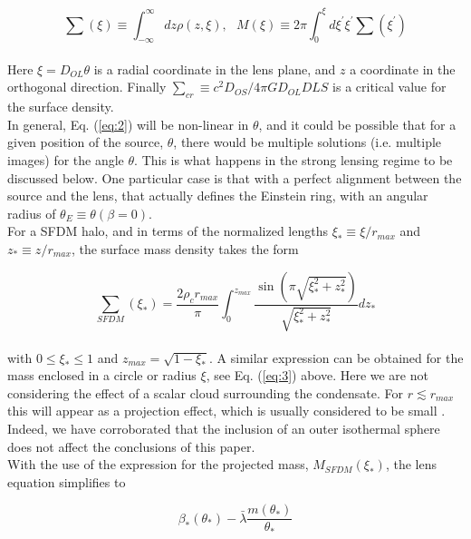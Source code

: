 \documentclass[8pt,letterpaper,twocolumn]{article}
\begin{document}
\begin{equation} \label{eq:3}
{\textstyle \sum}(\xi) \equiv \int_{-\infty}^{\infty} dz \rho(z,\xi),\ \ \ M(\xi) \equiv 2 \pi \int_{0}^{\xi}d\xi^\prime \xi^\prime  {\textstyle \sum}(\xi^\prime )
\end{equation}
\\
Here $\xi = D_{OL}\theta$ is a radial coordinate in the lens plane, and $z$ a coordinate in the orthogonal direction. Finally $\sum_{cr} \equiv c^2 D_{OS}/4\pi GD_{OL}D{LS}$ is a critical value for the surface density.\\

In general, Eq. (\ref{eq:2}) will be non-linear in $\theta$, and it could be possible that for a given position of the source, $\theta$, there would be multiple solutions (i.e. multiple images) for the angle $\theta$. This is what happens in the strong lensing regime to be discussed below. One particular case is that with a perfect alignment between the source and the lens, that actually defines the Einstein ring, with an angular radius of $\theta_E \equiv \theta (\beta = 0)$.\\

For a SFDM halo, and in terms of the normalized lengths $\xi_* \equiv \xi/r_{max}$ and  $z_* \equiv z/r_{max}$, the surface mass density takes the form

\begin{equation} \label{eq:4}
{\textstyle\sum_{SFDM}}(\xi_*) = \frac{2\rho_cr_{max}}{\pi} \int_{0}^{z_{max}} \frac{\sin(\pi \sqrt{\xi^2_* + z_*^2})}{\sqrt{\xi_*^2 + z_*^2}}dz_*
\end{equation}
\\
with $0 \leq \xi_* \leq 1$ and $z_{max} = \sqrt{1-\xi_*}$. A similar expression can be obtained for the mass enclosed in a circle or radius $\xi$, see Eq. (\ref{eq:3}) above. Here we are not considering the effect of a scalar cloud surrounding the condensate. For $ r \lesssim  r_{max}$ this will appear as a projection effect, which is usually considered to be small \cite{Kling_2008}. Indeed, we have corroborated that the inclusion of an outer isothermal sphere does not affect the conclusions of this paper.\\

With the use of the expression for the projected mass, $M_{SFDM}(\xi_*)$, the lens equation simplifies to

\begin{equation} \tag{5a} \label{eq:5a}
\beta_* (\theta_*)-\bar{\lambda} \frac{m(\theta_*)}{\theta_*}
\end{equation}
\end{document}
